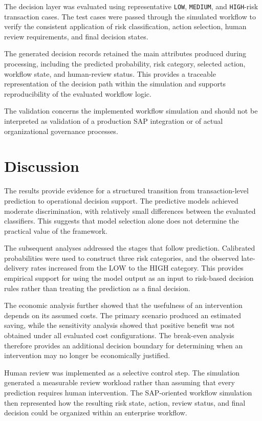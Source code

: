 \documentclass[10pt,a4paper]{article}
\begin{document}
The decision layer was evaluated using representative
\texttt{LOW}, \texttt{MEDIUM}, and \texttt{HIGH}-risk transaction cases.
The test cases were passed through the simulated workflow to verify the
consistent application of risk classification, action selection, human
review requirements, and final decision states.

The generated decision records retained the main attributes produced
during processing, including the predicted probability, risk category,
selected action, workflow state, and human-review status. This provides
a traceable representation of the decision path within the simulation
and supports reproducibility of the evaluated workflow logic.

The validation concerns the implemented workflow simulation and should
not be interpreted as validation of a production SAP integration or of
actual organizational governance processes.

\section{Discussion}

The results provide evidence for a structured transition from
transaction-level prediction to operational decision support. The
predictive models achieved moderate discrimination, with relatively
small differences between the evaluated classifiers. This suggests that
model selection alone does not determine the practical value of the
framework.

The subsequent analyses addressed the stages that follow prediction.
Calibrated probabilities were used to construct three risk categories,
and the observed late-delivery rates increased from the LOW to the HIGH
category. This provides empirical support for using the model output as
an input to risk-based decision rules rather than treating the prediction
as a final decision.

The economic analysis further showed that the usefulness of an
intervention depends on its assumed costs. The primary scenario produced
an estimated saving, while the sensitivity analysis showed that positive
benefit was not obtained under all evaluated cost configurations. The
break-even analysis therefore provides an additional decision boundary
for determining when an intervention may no longer be economically
justified.

Human review was implemented as a selective control step. The
simulation generated a measurable review workload rather than assuming
that every prediction requires human intervention. The SAP-oriented
workflow simulation then represented how the resulting risk state,
action, review status, and final decision could be organized within an
enterprise workflow.
\end{document}
